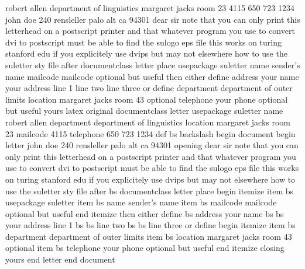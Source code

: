 robert allen department of linguistics margaret jacks room 23 4115 650 723 1234 john doe 240 rensleller palo alt ca 94301 dear sir note that you can only print this letterhead on a postscript printer and that whatever program you use to convert dvi to postscript must be able to find the sulogo eps file this works on turing stanford edu if you explicitely use dvips but may not elsewhere how to use the suletter sty file after documentclass letter place usepackage suletter name sender's name mailcode mailcode optional but useful then either define address your name your address line 1 line two line three or define department department of outer limits location margaret jacks room 43 optional telephone your phone optional but useful yours latex original documentclass letter usepackage suletter name robert allen department department of linguistics location margaret jacks room 23 mailcode 4115 telephone 650 723 1234 def bs backslash begin document begin letter john doe 240 rensleller palo alt ca 94301 opening dear sir note that you can only print this letterhead on a postscript printer and that whatever program you use to convert dvi to postscript must be able to find the sulogo eps file this works on turing stanford edu if you explicitely use dvips but may not elsewhere how to use the suletter sty file after bs documentclass letter place begin itemize item bs usepackage suletter item bs name sender's name item bs mailcode mailcode optional but useful end itemize then either define bs address your name bs bs your address line 1 bs bs line two bs bs line three or define begin itemize item bs department department of outer limits item bs location margaret jacks room 43 optional item bs telephone your phone optional but useful end itemize closing yours end letter end document
